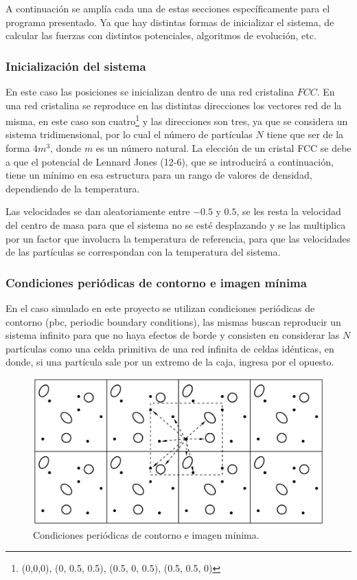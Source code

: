 \documentclass[a4paper,spanish,12pt,twoside]{article}
\begin{document}
A continuación se amplía cada una de estas secciones específicamente para el programa presentado. Ya que hay distintas formas de inicializar el sistema, de calcular las fuerzas con distintos potenciales, algoritmos de evolución, etc.

\subsubsection{Inicialización del sistema}

En este caso las posiciones se inicializan dentro de una red cristalina $FCC$. En una red cristalina se reproduce en las distintas direcciones los vectores red de la misma, en este caso son cuatro\footnote{(0,0,0), (0, 0.5, 0.5), (0.5, 0, 0.5), (0.5, 0.5, 0)} y las direcciones son tres, ya que se considera un sistema tridimensional, por lo cual el número de partículas $N$ tiene que ser de la forma $4 m^3$, donde $m$ es un número natural. La elección de un cristal FCC se debe a que el potencial de Lennard Jones (12-6), que se introducirá a continuación, tiene un mínimo en esa estructura para un rango de valores de densidad, dependiendo de la temperatura.

Las velocidades se dan aleatoriamente entre $-0.5$ y $0.5$, se les resta la velocidad del centro de masa para que el sistema no se esté desplazando y se las multiplica por un factor que involucra la temperatura de referencia, para que las velocidades de las partículas se correspondan con la temperatura del sistema.


\subsubsection{Condiciones periódicas de contorno e imagen mínima}

En el caso simulado en este proyecto se utilizan condiciones periódicas de contorno (pbc, periodic boundary conditions), las mismas buscan reproducir un sistema infinito para que no haya efectos de borde y consisten en considerar las $N$ partículas como una celda primitiva de una red infinita de celdas idénticas, en donde, si una partícula sale por un extremo de la caja, ingresa por el opuesto.

\begin{figure}[h]
	\centering
	\includegraphics[width=.7\textwidth]{pbc.png}
	\caption{Condiciones periódicas de contorno e imagen mínima.}
	\label{fig:pbc}
\end{figure}
\end{document}
